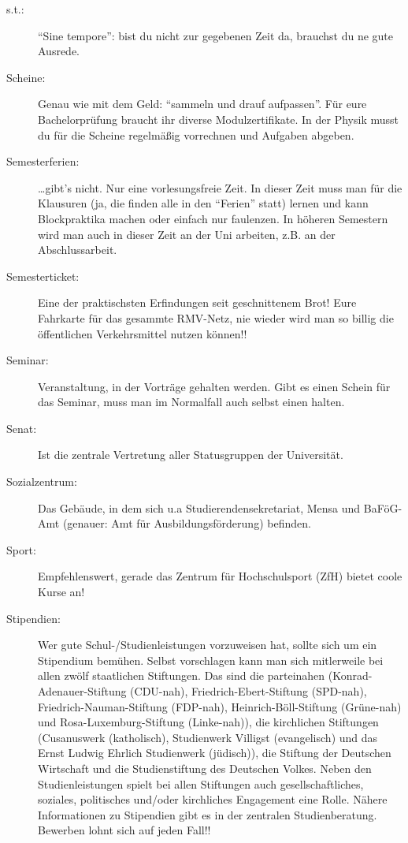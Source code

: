 \begin{description}
    \item[s.t.:] \enquote{Sine tempore}: bist du nicht zur gegebenen Zeit da, brauchst du ne gute Ausrede.

    \item[Scheine:] Genau wie mit dem Geld: \enquote{sammeln und drauf aufpassen}. Für eure Bachelorprüfung braucht ihr diverse Modulzertifikate. In der Physik musst du für die Scheine regelmäßig vorrechnen und Aufgaben abgeben.

    \item[Semesterferien:] \ldots gibt's nicht. Nur eine vorlesungsfreie Zeit. In dieser Zeit muss man für die Klausuren (ja, die finden alle in den \enquote{Ferien} statt) lernen und kann Blockpraktika machen oder einfach nur faulenzen. In höheren Semestern wird man auch in dieser Zeit an der Uni arbeiten, z.B. an der Abschlussarbeit.

    \item[Semesterticket:] Eine der praktischsten Erfindungen seit geschnittenem Brot! Eure Fahrkarte für das gesammte RMV-Netz, nie wieder wird man so billig die öffentlichen Verkehrsmittel nutzen können!!

    \item[Seminar:] Veranstaltung, in der Vorträge gehalten werden. Gibt es einen Schein für das Seminar, muss man im Normalfall auch selbst einen halten.

    \item[Senat:] Ist die zentrale Vertretung aller Statusgruppen der Universität.

    \item[Sozialzentrum:] Das Gebäude, in dem sich u.a Studierendensekretariat, Mensa und BaFöG-Amt (genauer: Amt für Ausbildungsförderung) befinden.

    \item[Sport:] Empfehlenswert, gerade das Zentrum für Hochschulsport (ZfH) bietet coole Kurse an!

    \item[Stipendien:] Wer gute Schul-/Studienleistungen vorzuweisen hat, sollte sich um ein Stipendium bemühen. Selbst vorschlagen kann man sich mitlerweile bei allen zwölf staatlichen Stiftungen. Das sind die parteinahen (Konrad-Adenauer-Stiftung (CDU-nah), Friedrich-Ebert-Stiftung (SPD-nah), Friedrich-Nauman-Stiftung (FDP-nah), Heinrich-Böll-Stiftung (Grüne-nah) und Rosa-Luxemburg-Stiftung (Linke-nah)), die kirchlichen Stiftungen (Cusanuswerk (katholisch), Studienwerk Villigst (evangelisch) und das Ernst Ludwig Ehrlich Studienwerk (jüdisch)), die Stiftung der Deutschen Wirtschaft und die Studienstiftung des Deutschen Volkes. Neben den Studienleistungen spielt bei allen Stiftungen auch gesellschaftliches, soziales, politisches und/oder kirchliches Engagement eine Rolle. Nähere Informationen zu Stipendien gibt es in der zentralen Studienberatung. Bewerben lohnt sich auf jeden Fall!!


\end{description}
